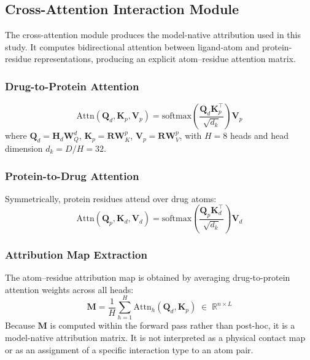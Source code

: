 \documentclass[fleqn,10pt]{wlscirep}
\begin{document}
\subsection{Cross-Attention Interaction Module}

The cross-attention module produces the model-native attribution used in this
study. It computes bidirectional attention between ligand-atom and
protein-residue representations, producing an explicit atom--residue attention
matrix.

\subsubsection{Drug-to-Protein Attention}

\begin{equation}
\mathrm{Attn}(\mathbf{Q}_d,\mathbf{K}_p,\mathbf{V}_p) =
  \mathrm{softmax}\!\left(\frac{\mathbf{Q}_d\mathbf{K}_p^\top}{\sqrt{d_k}}\right)
  \mathbf{V}_p
\end{equation}
where $\mathbf{Q}_d = \mathbf{H}_d\mathbf{W}_Q^d$,
$\mathbf{K}_p = \mathbf{R}\mathbf{W}_K^p$,
$\mathbf{V}_p = \mathbf{R}\mathbf{W}_V^p$, with $H=8$ heads and head
dimension $d_k = D/H = 32$.

\subsubsection{Protein-to-Drug Attention}

Symmetrically, protein residues attend over drug atoms:
\begin{equation}
\mathrm{Attn}(\mathbf{Q}_p,\mathbf{K}_d,\mathbf{V}_d) =
  \mathrm{softmax}\!\left(\frac{\mathbf{Q}_p\mathbf{K}_d^\top}{\sqrt{d_k}}\right)
  \mathbf{V}_d
\end{equation}

\subsubsection{Attribution Map Extraction}

The atom--residue attribution map is obtained by averaging drug-to-protein
attention weights across all heads:
\begin{equation}
\mathbf{M} = \frac{1}{H}\sum_{h=1}^{H}
  \mathrm{Attn}_h(\mathbf{Q}_d,\mathbf{K}_p)
  \;\in\;\mathbb{R}^{n\times L}
\label{eq:interaction_map}
\end{equation}
Because $\mathbf{M}$ is computed within the forward pass rather than post-hoc,
it is a model-native attribution matrix.  It is not interpreted as a physical
contact map or as an assignment of a specific interaction type to an atom pair.
\end{document}
